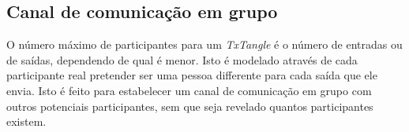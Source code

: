 

\subsection{Canal de comunicação em grupo}
\label{subsec:n-way-channel}

O número máximo de participantes para um {\em TxTangle} é o número de entradas ou de saídas, dependendo de qual é menor. Isto é modelado através de cada participante real pretender ser uma pessoa differente para cada saída que ele envia. Isto é feito para estabelecer um canal de comunicação em grupo com outros potenciais participantes, sem que seja revelado quantos participantes existem. 


